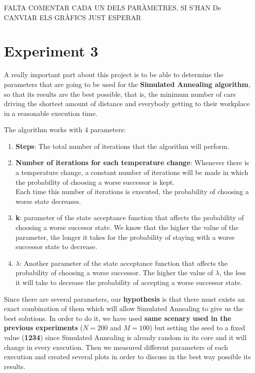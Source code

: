 \documentclass[12]{article}
\begin{document}
FALTA COMENTAR CADA UN DELS PARÀMETRES, SI S'HAN De CANVIAR ELS GRÀFICS JUST ESPERAR 


\section{Experiment 3}

A really important part about this project is to be able to determine the parameters that are going to be used for the \textbf{Simulated Annealing algorithm}, so that its results are the best possible, that is, the minimum number of cars driving the shortest amount of distance and everybody getting to their workplace in a reasonable execution time. 
\\
\medskip

The algorithm works with 4 parameters:
\begin{enumerate}
\item \textbf{Steps}: The total number of iterations that the algorithm will perform. 
\item \textbf{Number of iterations for each temperature change}: Whenever there is a temperature change, a constant number of iterations will be made in which the probability of choosing a worse successor is kept. 
\\
Each time this number of iterations is executed, the probability of choosing a worse state decreases. 
\item \textbf{k}: parameter of the state acceptance function that affects the probability of choosing a worse succesor state. We know that the higher the value of the parameter, the longer it takes for the probability of staying with a worse successor state to decrease. 

\item \textbf{$\lambda$}: Another parameter of the state acceptance function that affects the probability of choosing a worse successor. The higher the value of $\lambda$, the less it will take to decrease the probability of accepting a worse successor state. 


\end{enumerate}


Since there are several parameters, our \textbf{hypothesis} is that there must exists an exact combination of them which will allow Simulated Annealing to give us the best solutions. In order to do it, we have used \textbf{same scenary used in the previous experiments} ($N=200$ and $M=100$) but setting the seed to a fixed value (\textbf{1234}) since Simulated Annealing is already random in its core and it will change in every execution. Then we measured different parameters of each execution and created several plots in order to discuss in the best way possible its results. 
\end{document}
